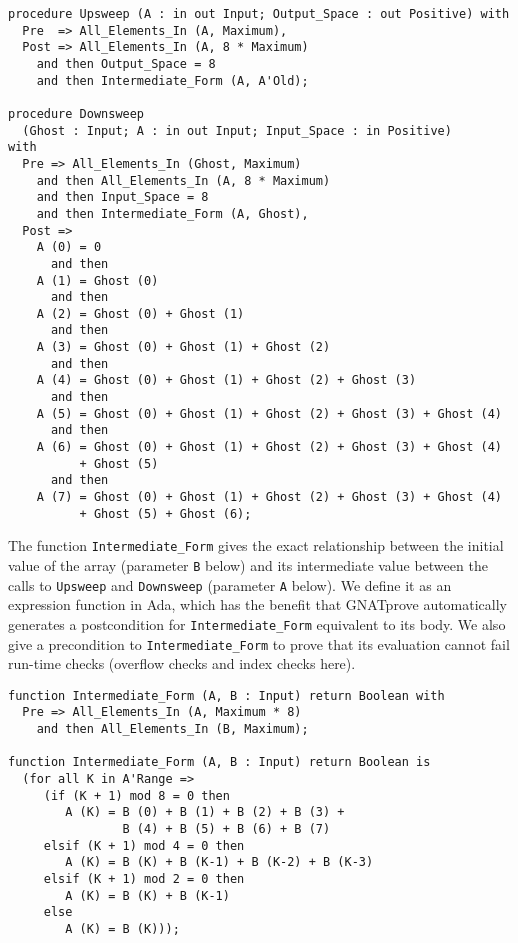 \documentclass[sttt,draft]{svjour}
\newcommand{\gnatprove}{GNATprove\xspace}
\begin{document}
\begin{footnotesize}
\begin{verbatim}
procedure Upsweep (A : in out Input; Output_Space : out Positive) with
  Pre  => All_Elements_In (A, Maximum),
  Post => All_Elements_In (A, 8 * Maximum)
    and then Output_Space = 8
    and then Intermediate_Form (A, A'Old);

procedure Downsweep
  (Ghost : Input; A : in out Input; Input_Space : in Positive)
with
  Pre => All_Elements_In (Ghost, Maximum)
    and then All_Elements_In (A, 8 * Maximum)
    and then Input_Space = 8
    and then Intermediate_Form (A, Ghost),
  Post =>
    A (0) = 0
      and then
    A (1) = Ghost (0)
      and then
    A (2) = Ghost (0) + Ghost (1)
      and then
    A (3) = Ghost (0) + Ghost (1) + Ghost (2)
      and then
    A (4) = Ghost (0) + Ghost (1) + Ghost (2) + Ghost (3)
      and then
    A (5) = Ghost (0) + Ghost (1) + Ghost (2) + Ghost (3) + Ghost (4)
      and then
    A (6) = Ghost (0) + Ghost (1) + Ghost (2) + Ghost (3) + Ghost (4)
          + Ghost (5)
      and then
    A (7) = Ghost (0) + Ghost (1) + Ghost (2) + Ghost (3) + Ghost (4)
          + Ghost (5) + Ghost (6);
\end{verbatim}
\end{footnotesize}

The function \verb|Intermediate_Form| gives the exact relationship between the
initial value of the array (parameter \verb|B| below) and its intermediate
value between the calls to \verb|Upsweep| and \verb|Downsweep| (parameter
\verb|A| below). We define it as an expression function in Ada, which has the
benefit that \gnatprove automatically generates a postcondition for
\verb|Intermediate_Form| equivalent to its body. We also give a precondition to
\verb|Intermediate_Form| to prove that its evaluation cannot fail run-time
checks (overflow checks and index checks here).

\begin{footnotesize}
\begin{verbatim}
function Intermediate_Form (A, B : Input) return Boolean with
  Pre => All_Elements_In (A, Maximum * 8)
    and then All_Elements_In (B, Maximum);

function Intermediate_Form (A, B : Input) return Boolean is
  (for all K in A'Range =>
     (if (K + 1) mod 8 = 0 then
        A (K) = B (0) + B (1) + B (2) + B (3) +
                B (4) + B (5) + B (6) + B (7)
     elsif (K + 1) mod 4 = 0 then
        A (K) = B (K) + B (K-1) + B (K-2) + B (K-3)
     elsif (K + 1) mod 2 = 0 then
        A (K) = B (K) + B (K-1)
     else
        A (K) = B (K)));
\end{verbatim}
\end{footnotesize}
\end{document}
